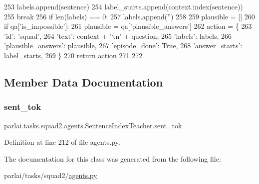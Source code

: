 \begin{DoxyCode}
253                     labels.append(sentence)
254                     label\_starts.append(context.index(sentence))
255                     \textcolor{keywordflow}{break}
256         \textcolor{keywordflow}{if} len(labels) == 0:
257             labels.append(\textcolor{stringliteral}{''})
258 
259         plausible = []
260         \textcolor{keywordflow}{if} qa[\textcolor{stringliteral}{'is\_impossible'}]:
261             plausible = qa[\textcolor{stringliteral}{'plausible\_answers'}]
262         action = \{
263             \textcolor{stringliteral}{'id'}: \textcolor{stringliteral}{'squad'},
264             \textcolor{stringliteral}{'text'}: context + \textcolor{stringliteral}{'\(\backslash\)n'} + question,
265             \textcolor{stringliteral}{'labels'}: labels,
266             \textcolor{stringliteral}{'plausible\_answers'}: plausible,
267             \textcolor{stringliteral}{'episode\_done'}: \textcolor{keyword}{True},
268             \textcolor{stringliteral}{'answer\_starts'}: label\_starts,
269         \}
270         \textcolor{keywordflow}{return} action
271 
272 
\end{DoxyCode}


\subsection{Member Data Documentation}
\mbox{\label{classparlai_1_1tasks_1_1squad2_1_1agents_1_1SentenceIndexTeacher_ac9b01a4a40b5a1a6de68d24e075a22fb}} 
\subsubsection{\texorpdfstring{sent\+\_\+tok}{sent\_tok}}
{\footnotesize\ttfamily parlai.\+tasks.\+squad2.\+agents.\+Sentence\+Index\+Teacher.\+sent\+\_\+tok}



Definition at line 212 of file agents.\+py.



The documentation for this class was generated from the following file\+:\begin{DoxyCompactItemize}
\item 
parlai/tasks/squad2/\hyperlink{parlai_2tasks_2squad2_2agents_8py}{agents.\+py}\end{DoxyCompactItemize}
